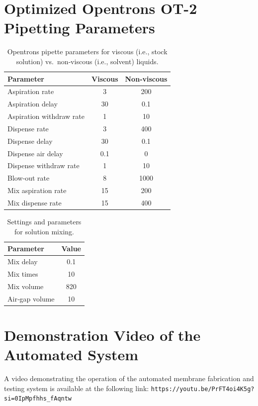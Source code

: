 \documentclass[preprint,12pt]{elsarticle}
\begin{document}
\section{Optimized Opentrons OT-2 Pipetting Parameters}
\begin{table}[htbp]
\centering
\caption{Opentrons pipette parameters for viscous (i.e., stock solution) vs.\ non‑viscous (i.e., solvent) liquids.}
\label{tab:opentrons_liquid_specific}
\begin{tabular}{lcc}
\hline
\textbf{Parameter} & \textbf{Viscous} & \textbf{Non‑viscous} \\
\hline
Aspiration rate                 & 3          & 200  \\
Aspiration delay                & 30         & 0.1  \\
Aspiration withdraw rate        & 1          & 10   \\
Dispense rate                   & 3          & 400  \\
Dispense delay                  & 30         & 0.1  \\
Dispense air delay              & 0.1        & 0    \\
Dispense withdraw rate          & 1          & 10   \\
Blow‑out rate                   & 8          & 1000 \\
Mix aspiration rate             & 15         & 200  \\
Mix dispense rate               & 15         & 400  \\
\hline
\end{tabular}
\end{table}

\begin{table}[htbp]
\centering
\caption{Settings and parameters for solution mixing.}
\label{tab:opentrons_common_params}
\begin{tabular}{lc}
\hline
\textbf{Parameter} & \textbf{Value} \\
\hline
Mix delay     & 0.1 \\
Mix times     & 10  \\
Mix volume    & 820 \\
Air‑gap volume & 10  \\
\hline
\end{tabular}
\end{table}


\section{Demonstration Video of the Automated System}
A video demonstrating the operation of the automated membrane fabrication and testing system is available at the following link: \texttt{https://youtu.be/PrFT4oi4K5g?si=0IpMpfhhs\_fAqntw}
\end{document}
